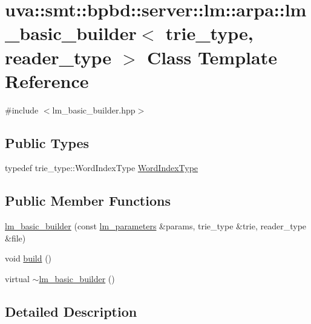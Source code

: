 \hypertarget{classuva_1_1smt_1_1bpbd_1_1server_1_1lm_1_1arpa_1_1lm__basic__builder}{}\section{uva\+:\+:smt\+:\+:bpbd\+:\+:server\+:\+:lm\+:\+:arpa\+:\+:lm\+\_\+basic\+\_\+builder$<$ trie\+\_\+type, reader\+\_\+type $>$ Class Template Reference}
\label{classuva_1_1smt_1_1bpbd_1_1server_1_1lm_1_1arpa_1_1lm__basic__builder}


{\ttfamily \#include $<$lm\+\_\+basic\+\_\+builder.\+hpp$>$}

\subsection*{Public Types}
\begin{DoxyCompactItemize}
\item 
typedef trie\+\_\+type\+::\+Word\+Index\+Type \hyperlink{classuva_1_1smt_1_1bpbd_1_1server_1_1lm_1_1arpa_1_1lm__basic__builder_a8011babc7fa7b15bf2499306a0c3e6e9}{Word\+Index\+Type}
\end{DoxyCompactItemize}
\subsection*{Public Member Functions}
\begin{DoxyCompactItemize}
\item 
\hyperlink{classuva_1_1smt_1_1bpbd_1_1server_1_1lm_1_1arpa_1_1lm__basic__builder_a9355c092a6a91c991de8fa5e2589de01}{lm\+\_\+basic\+\_\+builder} (const \hyperlink{structuva_1_1smt_1_1bpbd_1_1server_1_1lm_1_1lm__parameters}{lm\+\_\+parameters} \&params, trie\+\_\+type \&trie, reader\+\_\+type \&file)
\item 
void \hyperlink{classuva_1_1smt_1_1bpbd_1_1server_1_1lm_1_1arpa_1_1lm__basic__builder_ad41e307afc8e6a607e8bd19a14cac8cb}{build} ()
\item 
virtual \hyperlink{classuva_1_1smt_1_1bpbd_1_1server_1_1lm_1_1arpa_1_1lm__basic__builder_af978da47306dcb5b3a598bcce7aa82fc}{$\sim$lm\+\_\+basic\+\_\+builder} ()
\end{DoxyCompactItemize}


\subsection{Detailed Description}
